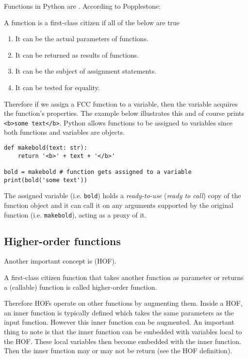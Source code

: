 \documentclass[a4paper]{article}
\begin{document}
Functions in Python are . According to Popplestone:
\begin{definition}
A function is a first-class citizen if all of the below are true
\begin{enumerate}
    \item It can be the actual parameters of functions.
    \item It can be returned as results of functions.
    \item It can be the subject of assignment statements.
    \item It can be tested for equality.
\end{enumerate}
\end{definition}
Therefore if we assign a FCC function to a variable, then the variable acquires the function's properties. The example below illustrates this and of course prints \texttt{<b>some text</b>}. Python allows functions to be assigned to variables since both functions and variables are objects.
\begin{verbatim}
def makebold(text: str):
    return '<b>' + text + '</b>'

bold = makebold # function gets assigned to a variable
print(bold('some text'))
\end{verbatim}
The assigned variable (i.e. \texttt{bold}) holds a \textit{ready-to-use} (\textit{ready to call}) copy of the function object and it can call it on any arguments supported by the original function (i.e. \texttt{makebold}), acting as a proxy of it.


\subsection{Higher-order functions}
Another important concept is  (HOF). 
\begin{definition}
A first-class citizen function that takes another function as parameter or returns a (callable) function is called higher-order function.
\end{definition}
Therefore HOFs operate on other functions by augmenting them. Inside a HOF, an inner function is typically defined which takes the same parameters as the input function. However this inner function can be augmented. An important thing to note is that the inner function can be embedded with variables local to the HOF. These local variables then become embedded with the inner function. Then the inner function may or may not be return (see the HOF definition).
\end{document}
